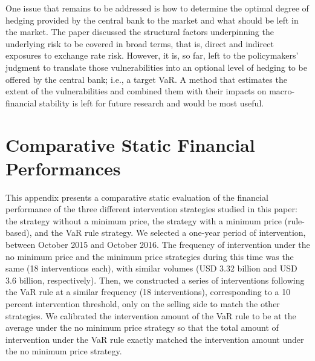 \documentclass[11pt]{article}
\begin{document}
One issue that remains to be addressed  is how to determine the optimal degree
of hedging provided by the central bank  to the market and what should be left
in the  market. The  paper discussed the  structural factors  underpinning the
underlying risk  to be covered  in broad terms,  that is, direct  and indirect
exposures  to  exchange rate  risk.   However,  it is,  so  far,  left to  the
policymakers'  judgment to  translate those  vulnerabilities into  an optional
level of  hedging to be  offered by  the central bank;  i.e., a target  VaR. A
method that estimates the extent of the vulnerabilities and combined them with
their impacts  on macro-financial  stability is left  for future  research and
would be most useful.\\



\newpage
{}
\singlespacing



\newpage
\appendix 
\section{Comparative Static Financial Performances}
\label{sec:fin-perf}

This  appendix  presents a  comparative  static  evaluation of  the  financial
performance of  the three  different intervention  strategies studied  in this
paper: the strategy without a minimum price, the strategy with a minimum price
(rule-based), and  the VaR  rule strategy.  We selected  a one-year  period of
intervention,  between  October  2015  and  October  2016.  The  frequency  of
intervention  under the  no minimum  price  and the  minimum price  strategies
during this  time was the same  (18 interventions each), with  similar volumes
(USD 3.32 billion  and USD 3.6 billion, respectively). Then,  we constructed a
series of  interventions following  the VaR  rule at  a similar  frequency (18
interventions), corresponding to a 10  percent intervention threshold, only on
the selling side to match the other strategies. We calibrated the intervention
amount  of the  VaR rule  to be  at  the average  under the  no minimum  price
strategy so that  the total amount of intervention under  the VaR rule exactly
matched the intervention amount under the no minimum price strategy.\\
\end{document}

